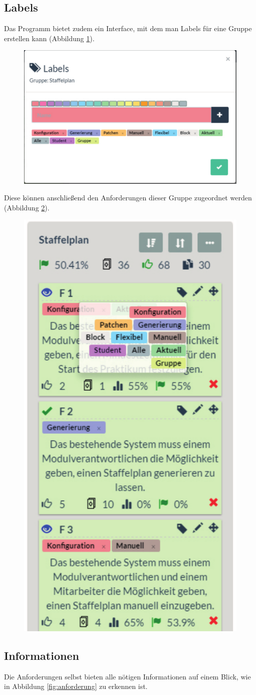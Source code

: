 \subsection{Labels}
Das Programm bietet zudem ein Interface, mit dem man Labels für eine Gruppe erstellen kann (Abbildung \ref{fig:labelerstellen}).

\begin{figure}[!htb]
		\includegraphics[width=.5\textwidth]{images/labelserstellen.pdf}
\centering 
{} 
\label{fig:labelerstellen}
\end{figure}

Diese können anschließend den Anforderungen dieser Gruppe zugeordnet werden (Abbildung \ref{fig:labelzuordnen}). 

\begin{figure}[!htb]
		\includegraphics[width=.25\textwidth]{images/labelzuordnen.pdf}
\centering 
{} 
\label{fig:labelzuordnen}
\end{figure}

\subsection{Informationen}
Die Anforderungen selbst bieten alle nötigen Informationen auf einem Blick, wie in Abbildung \ref{fig:anforderung} zu erkennen ist.

